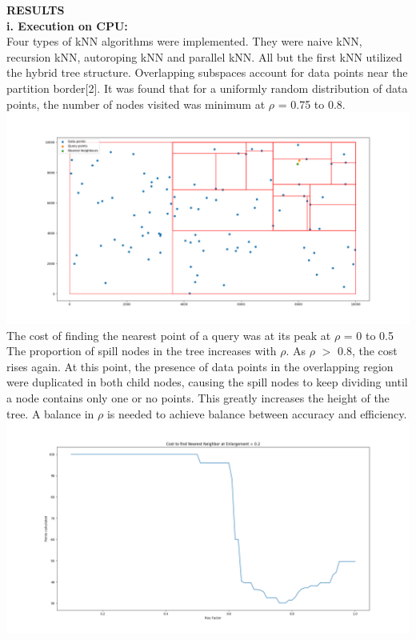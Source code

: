 \documentclass{article}
\begin{document}
\large\noindent
\textbf{RESULTS}\\
\normalsize
\newline
\textbf{i. Execution on CPU:}\\
Four types of kNN algorithms were implemented. They were naive kNN, recursion kNN, autoroping kNN and parallel kNN. All but the first kNN utilized the hybrid tree structure. Overlapping subspaces account for data points near the partition border[2]. It was found that for a uniformly random distribution of data points, the number of nodes visited was minimum at $\rho$ = 0.75 to 0.8.\\
\includegraphics[scale=0.36]{../sptree/visualization/chart_points_partition}
\newpage\noindent
The cost of finding the nearest point of a query was at its peak at $\rho$ = 0 to 0.5\\
The proportion of spill nodes in the tree increases with $\rho$. As $\rho$ $>$ 0.8, the cost rises again. At this point, the presence of data points in the overlapping region were duplicated in both child nodes, causing the spill nodes to keep dividing until a node contains only one or no points. This greatly increases the height of the tree. A balance in $\rho$ is needed to achieve balance between accuracy and efficiency.\\
\includegraphics[scale=0.38]{../sptree/visualization/chart_cost_rou}
\end{document}
